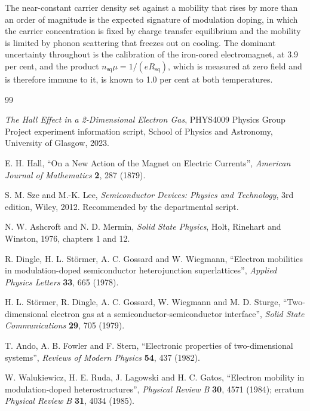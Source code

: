 \documentclass[11pt,a4paper]{article}
\newcommand{\Rsq}{R_{\mathrm{sq}}}
\newcommand{\nsq}{n_{\mathrm{sq}}}
\begin{document}
The near-constant carrier density set against a mobility that rises by more than an order of
magnitude is the expected signature of modulation doping, in which the carrier concentration
is fixed by charge transfer equilibrium and the mobility is limited by phonon scattering that
freezes out on cooling. The dominant uncertainty throughout is the calibration of the
iron-cored electromagnet, at \num{3.9} per cent, and the product $\nsq\mu = 1/(e\Rsq)$, which
is measured at zero field and is therefore immune to it, is known to \num{1.0} per cent at
both temperatures.

\begin{thebibliography}{99}
\small\setlength{\itemsep}{1pt}

 \textit{The Hall Effect in a 2-Dimensional Electron Gas}, PHYS4009 Physics
Group Project experiment information script, School of Physics and Astronomy, University of
Glasgow, 2023.

 E. H. Hall, ``On a New Action of the Magnet on Electric Currents'',
\textit{American Journal of Mathematics} \textbf{2}, 287 (1879).

 S. M. Sze and M.-K. Lee, \textit{Semiconductor Devices: Physics and
Technology}, 3rd edition, Wiley, 2012. Recommended by the departmental script.

 N. W. Ashcroft and N. D. Mermin, \textit{Solid State Physics}, Holt,
Rinehart and Winston, 1976, chapters 1 and 12.

 R. Dingle, H. L. St\"ormer, A. C. Gossard and W. Wiegmann, ``Electron
mobilities in modulation-doped semiconductor heterojunction superlattices'', \textit{Applied
Physics Letters} \textbf{33}, 665 (1978).

 H. L. St\"ormer, R. Dingle, A. C. Gossard, W. Wiegmann and M. D. Sturge,
``Two-dimensional electron gas at a semiconductor-semiconductor interface'', \textit{Solid
State Communications} \textbf{29}, 705 (1979).

 T. Ando, A. B. Fowler and F. Stern, ``Electronic properties of
two-dimensional systems'', \textit{Reviews of Modern Physics} \textbf{54}, 437 (1982).

 W. Walukiewicz, H. E. Ruda, J. Lagowski and H. C. Gatos, ``Electron
mobility in modulation-doped heterostructures'', \textit{Physical Review B} \textbf{30}, 4571
(1984); erratum \textit{Physical Review B} \textbf{31}, 4034 (1985).


\end{thebibliography}
\end{document}
